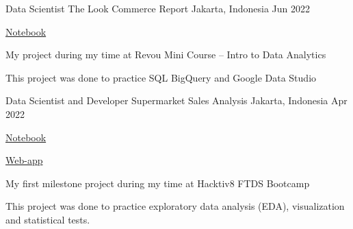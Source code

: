 \begin{cventries}
  \cventry
    {Data Scientist} %
    {The Look Commerce Report} %
    {Jakarta, Indonesia} %
    {Jun 2022} %
    {
      \begin{cvitems} %
        \item {\href{https://datastudio.google.com/s/vI4f1mokRRo}{Notebook}}
        \item {My project during my time at Revou Mini Course – Intro to Data Analytics}
        \item {This project was done to practice SQL BigQuery and Google Data Studio}
      \end{cvitems}
    }

  \cventry
    {Data Scientist and Developer} %
    {Supermarket Sales Analysis} %
    {Jakarta, Indonesia} %
    {Apr 2022} %
    {
      \begin{cvitems} %
        \item {\href{https://github.com/NikkiSatmaka/supermarket-sales-analysis/blob/main/h8dsft_Milestone1_nikki_satmaka.ipynb}{Notebook}}
        \item {\href{https://nikki-satmaka-ftds-011-p0m1.herokuapp.com/}{Web-app}}
        \item {My first milestone project during my time at Hacktiv8 FTDS Bootcamp}
        \item {This project was done to practice exploratory data analysis (EDA), visualization and statistical tests.}
      \end{cvitems}
    }

\end{cventries}
